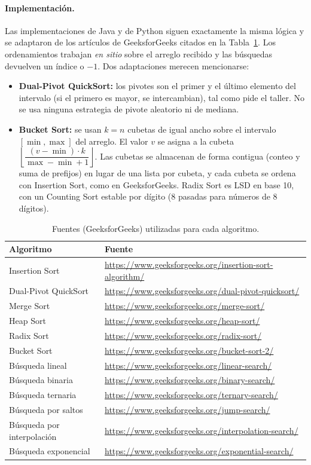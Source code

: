 \documentclass[11pt,a4paper]{article}
\begin{document}
\paragraph{Implementaci\'on.} Las implementaciones de Java y de Python siguen exactamente la misma l\'ogica y
se adaptaron de los art\'iculos de GeeksforGeeks citados en la Tabla~\ref{tab:fuentes}. Los ordenamientos
trabajan \emph{en sitio} sobre el arreglo recibido y las b\'usquedas devuelven un \'indice o $-1$. Dos
adaptaciones merecen mencionarse:
\begin{itemize}
  \item \textbf{Dual-Pivot QuickSort:} los pivotes son el primer y el \'ultimo elemento del intervalo (si el
  primero es mayor, se intercambian), tal como pide el taller. No se usa ninguna estrategia de pivote
  aleatorio ni de mediana.
  \item \textbf{Bucket Sort:} se usan $k=n$ cubetas de igual ancho sobre el intervalo $[\min,\max]$ del
  arreglo. El valor $v$ se asigna a la cubeta $\left\lfloor \dfrac{(v-\min)\cdot k}{\max-\min+1}\right\rfloor$.
  Las cubetas se almacenan de forma contigua (conteo y suma de prefijos) en lugar de una lista por cubeta, y
  cada cubeta se ordena con Insertion Sort, como en GeeksforGeeks. Radix Sort es LSD en base 10, con un
  Counting Sort estable por d\'igito (8 pasadas para n\'umeros de 8 d\'igitos).
\end{itemize}

\begin{table}[htbp]
\centering
\caption{Fuentes (GeeksforGeeks) utilizadas para cada algoritmo.}\label{tab:fuentes}
{\footnotesize
\begin{tabular}{ll}
\toprule
Algoritmo & Fuente \\
\midrule
Insertion Sort & \url{https://www.geeksforgeeks.org/insertion-sort-algorithm/} \\
Dual-Pivot QuickSort & \url{https://www.geeksforgeeks.org/dual-pivot-quicksort/} \\
Merge Sort & \url{https://www.geeksforgeeks.org/merge-sort/} \\
Heap Sort & \url{https://www.geeksforgeeks.org/heap-sort/} \\
Radix Sort & \url{https://www.geeksforgeeks.org/radix-sort/} \\
Bucket Sort & \url{https://www.geeksforgeeks.org/bucket-sort-2/} \\
B\'usqueda lineal & \url{https://www.geeksforgeeks.org/linear-search/} \\
B\'usqueda binaria & \url{https://www.geeksforgeeks.org/binary-search/} \\
B\'usqueda ternaria & \url{https://www.geeksforgeeks.org/ternary-search/} \\
B\'usqueda por saltos & \url{https://www.geeksforgeeks.org/jump-search/} \\
B\'usqueda por interpolaci\'on & \url{https://www.geeksforgeeks.org/interpolation-search/} \\
B\'usqueda exponencial & \url{https://www.geeksforgeeks.org/exponential-search/} \\
\bottomrule
\end{tabular}}
\end{table}
\end{document}
